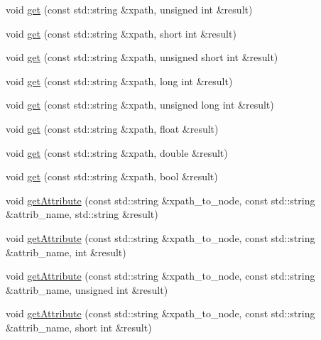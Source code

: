 \begin{DoxyCompactItemize}
void \mbox{\hyperlink{classXMLXPathReader_1_1BasicXPathReader_a222a3dc8dee6c0d895d6097d1c8912c4}{get}} (const std\+::string \&xpath, unsigned int \&result)
\item 
void \mbox{\hyperlink{classXMLXPathReader_1_1BasicXPathReader_a27d9f746973b5a3c82be48aa0a136a5f}{get}} (const std\+::string \&xpath, short int \&result)
\item 
void \mbox{\hyperlink{classXMLXPathReader_1_1BasicXPathReader_ab98035f589c3948b5502382a0ec547be}{get}} (const std\+::string \&xpath, unsigned short int \&result)
\item 
void \mbox{\hyperlink{classXMLXPathReader_1_1BasicXPathReader_a9e29d524c6bc42204d3decd8d60668ac}{get}} (const std\+::string \&xpath, long int \&result)
\item 
void \mbox{\hyperlink{classXMLXPathReader_1_1BasicXPathReader_a4690603044003c58147ca5bf05cbbebc}{get}} (const std\+::string \&xpath, unsigned long int \&result)
\item 
void \mbox{\hyperlink{classXMLXPathReader_1_1BasicXPathReader_a854bc120638a101a6ca7d54d600d8a85}{get}} (const std\+::string \&xpath, float \&result)
\item 
void \mbox{\hyperlink{classXMLXPathReader_1_1BasicXPathReader_a1e5bc162a84ba6853206432c2d1fc7e4}{get}} (const std\+::string \&xpath, double \&result)
\item 
void \mbox{\hyperlink{classXMLXPathReader_1_1BasicXPathReader_acd980a7c2b6ac5914d5ca78517e3fa3d}{get}} (const std\+::string \&xpath, bool \&result)
\item 
void \mbox{\hyperlink{classXMLXPathReader_1_1BasicXPathReader_ab35c63e2c1b2dad0485f9272f3d03ed6}{get\+Attribute}} (const std\+::string \&xpath\+\_\+to\+\_\+node, const std\+::string \&attrib\+\_\+name, std\+::string \&result)
\item 
void \mbox{\hyperlink{classXMLXPathReader_1_1BasicXPathReader_a198279405bb6f7cbef71708ece30155d}{get\+Attribute}} (const std\+::string \&xpath\+\_\+to\+\_\+node, const std\+::string \&attrib\+\_\+name, int \&result)
\item 
void \mbox{\hyperlink{classXMLXPathReader_1_1BasicXPathReader_a89d7b86c9ddc14aa88a33d48990651a1}{get\+Attribute}} (const std\+::string \&xpath\+\_\+to\+\_\+node, const std\+::string \&attrib\+\_\+name, unsigned int \&result)
\item 
void \mbox{\hyperlink{classXMLXPathReader_1_1BasicXPathReader_a8760cec5a2ac2ec43a04d013942edd19}{get\+Attribute}} (const std\+::string \&xpath\+\_\+to\+\_\+node, const std\+::string \&attrib\+\_\+name, short int \&result)

\end{DoxyCompactItemize}
